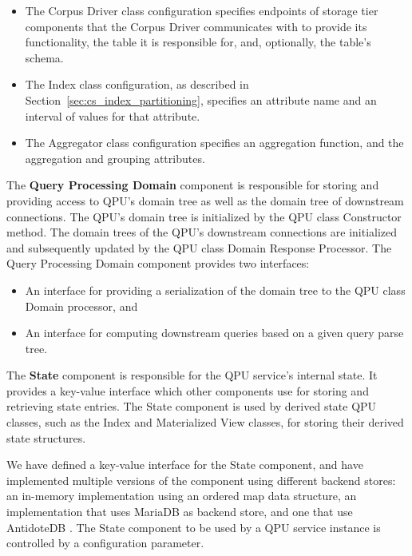 \begin{itemize}
  \item The Corpus Driver class configuration specifies endpoints of storage tier components that the Corpus Driver communicates with to provide its functionality,
  the table it is responsible for, and, optionally, the table's schema.

  \item The Index class configuration, as described in Section~\ref{sec:cs_index_partitioning},
  specifies an attribute name and an interval of values for that attribute.

  \item The Aggregator class configuration specifies an aggregation function, and the aggregation and grouping attributes.
\end{itemize}

\medskip
\noindent
The \textbf{Query Processing Domain} component is responsible for storing and providing access to QPU's domain tree as well
as the domain tree of downstream connections.
The QPU's domain tree is initialized by the QPU class Constructor method.
The domain trees of the QPU's downstream connections are initialized and subsequently updated by the QPU class Domain Response Processor.
The Query Processing Domain component provides two interfaces:
\begin{itemize}
  \item An interface for providing a serialization of the domain tree to the QPU class Domain processor, and
  \item An interface for computing downstream queries based on a given query parse tree.
\end{itemize}

\medskip
\noindent
The \textbf{State} component is responsible for the QPU service's internal state.
It provides a key-value interface which other components use for storing and retrieving state entries.
The State component is used by derived state QPU classes, such as the Index and Materialized View classes,
for storing their derived state structures.

We have defined a key-value interface for the State component,
and have implemented multiple versions of the component using different backend stores:
an in-memory implementation using an ordered map data structure,
an implementation that uses MariaDB \cite{mariadb:docs} as backend store,
and one that use AntidoteDB \cite{antidotedb:docs}.
The State component to be used by a QPU service instance is controlled by a configuration parameter.

